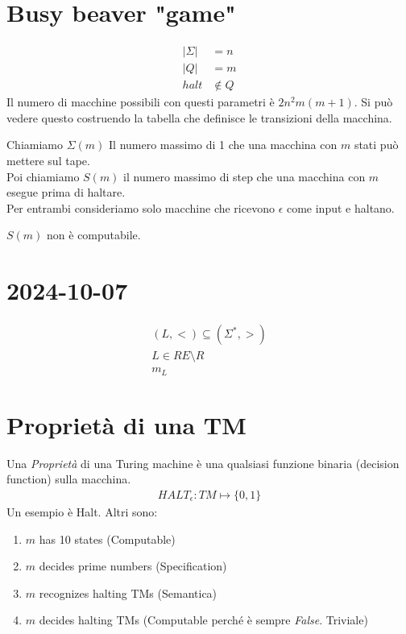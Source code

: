 \documentclass{article}
\begin{document}
\section{Busy beaver "game"}
\begin{align*}
    |\Sigma| &= n \\
    |Q| &= m \\
    halt &\not\in Q
\end{align*}
Il numero di macchine possibili con questi parametri è $2n^2m(m+1)$. Si può vedere questo costruendo la tabella che definisce le transizioni della macchina.

Chiamiamo $\Sigma(m)$ Il numero massimo di 1 che una macchina con $m$ stati può mettere sul tape.  \\
Poi chiamiamo $S(m)$ il numero massimo di step che una macchina con $m$ esegue prima di haltare. \\
Per entrambi consideriamo solo macchine che ricevono $\epsilon$ come input e haltano.

$S(m)$ non è computabile.

\section{2024-10-07}
\begin{gather*}
    (L,<)\subseteq (\Sigma^*,>) \\
    L\in RE \setminus R \\
    m_L
\end{gather*}

\section{Proprietà di una TM}
Una \textit{Proprietà} di una Turing machine è una qualsiasi funzione binaria (decision function) sulla macchina.
\begin{align*}
    HALT_\epsilon: TM \mapsto \{0,1\}
\end{align*}
Un esempio è Halt. Altri sono:
\begin{enumerate}
    \item $m$ has 10 states (Computable)
    \item $m$ decides prime numbers (Specification)
    \item $m$ recognizes halting TMs (Semantica)
    \item $m$ decides halting TMs (Computable perché è sempre \textit{False}. Triviale)
\end{enumerate}
\end{document}
